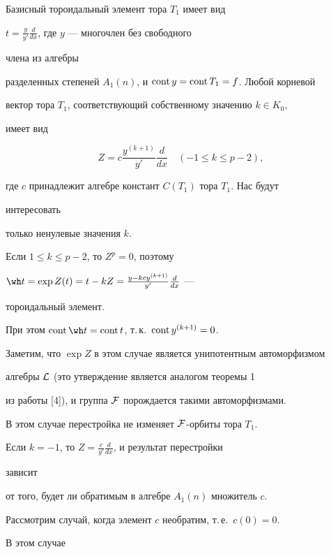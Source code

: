  


\begin{pf} Базисный тороидальный элемент тора $T_1$ имеет вид 


$t=\frac{y}{y'}\frac{d}{dx}$, где $y$ --- многочлен без свободного 


члена из алгебры 


разделенных степеней $A_1(n)$, и $\operatorname{cont} y=\operatorname{cont} T_1=f$. Любой корневой 


вектор тора $T_1$, соответствующий собственному значению $k\in K_0$, 


имеет вид 


$$ 


Z=c\frac{y^{(k+1)}}{y'}\frac{d}{dx}\quad (-1\le k\le p-2), 


$$ 


где $c$ принадлежит алгебре констант $C(T_1)$ тора $T_1$. Нас будут 


интересовать 


только ненулевые значения $k$. 


 


Если $1\le k\le p-2$, то $Z^p=0$, поэтому 


$\wh t=\exp Z(t)=t-kZ=\frac{y-kcy^{(k+1)}}{y'}\frac{d}{dx}$ --- 


тороидальный элемент. 


При этом $\cont\wh t=\cont t$, т.\,к.~$\operatorname{cont} y^{(k+1)}=0$. 


 


Заметим, что $\exp Z$ в этом случае является унипотентным автоморфизмом 


алгебры $\cal L$ (это утверждение является аналогом теоремы 1 


из работы [4]), и группа $\cal F$ порождается такими автоморфизмами. 


В этом случае перестройка не изменяет $\cal F$-орбиты тора $T_1$. 


 


Если $k=-1$, то $Z=\frac{c}{y'}\frac{d}{dx}$, и результат перестройки 


зависит 


от того, будет ли обратимым в алгебре $A_1(n)$ множитель $c$. 


 


Рассмотрим случай, когда элемент $c$ необратим, т.\,е.~$c(0)=0$. 


В этом случае 



\end{pf}
